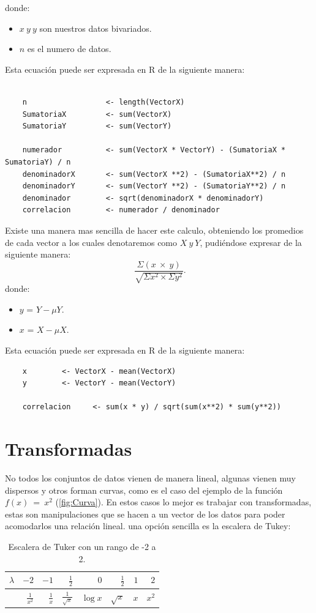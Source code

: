 \documentclass[]{article}
\begin{document}
donde:
\begin{itemize}
	\item $x\ y\ y$ son nuestros datos bivariados.
	\item $n$ es el numero de datos.
\end{itemize}
Esta ecuación puede ser expresada en R de la siguiente manera:
  \begin{lstlisting}

    n                  <- length(VectorX)
    SumatoriaX         <- sum(VectorX)
    SumatoriaY         <- sum(VectorY)
    
    numerador          <- sum(VectorX * VectorY) - (SumatoriaX * SumatoriaY) / n
    denominadorX       <- sum(VectorX **2) - (SumatoriaX**2) / n
    denominadorY       <- sum(VectorY **2) - (SumatoriaY**2) / n
    denominador        <- sqrt(denominadorX * denominadorY)
    correlacion        <- numerador / denominador
   \end{lstlisting}
Existe una manera mas sencilla de hacer este calculo, obteniendo los promedios de cada vector  a los cuales denotaremos como $X\ y\ Y$, pudiéndose expresar de la siguiente manera:
\[\ \frac{\Sigma\left(x\ \times\ y\right)}{\sqrt{\Sigma x^2\times\Sigma y^2}}.\]
donde:
\begin{itemize}
	\item $y$ = $Y - \mu Y$.
	\item $x$ = $X - \mu X$.

\end{itemize}
Esta ecuación puede ser expresada en R de la siguiente manera:
  \begin{lstlisting}
    x        <- VectorX - mean(VectorX)
    y        <- VectorY - mean(VectorY)
    
    correlacion     <- sum(x * y) / sqrt(sum(x**2) * sum(y**2))
   \end{lstlisting}

\section{Transformadas}
No todos los conjuntos de datos vienen de manera lineal, algunas vienen muy dispersos y otros forman curvas, como es el caso del ejemplo de la función $f\left(x\right)\ =\ x^2$ (\autoref{fig:Curva}). 
En estos casos lo mejor es trabajar con transformadas, estas son manipulaciones que se hacen a un vector de los datos para poder acomodarlos una relación lineal. 
una opción sencilla es la escalera de Tukey:

\begin{table}[hbt!]
\begin{center}
 \begin{tabular}{c|r|r|r|r|r|r|r}
    $\lambda$ & $-2$ & $-1$ & $\frac{1}{2}$ & $0$ & $\frac{1}{2}$ & $1$ & $2$\\
   \hline
    & $\frac{1}{x^2}$ & $\frac{1}{x}$ & $\frac{1}{\sqrt{x}}$ & $\log x$ & $\sqrt{x}$ & $x$ & $x^2$ \\
   \hline
 \end{tabular}
 \caption{Escalera de Tuker con un rango de -2 a 2.}
 
\label{t1}
\end{center}
\end{table}
\end{document}
